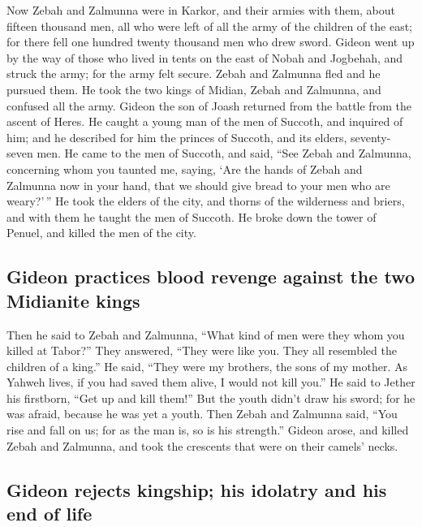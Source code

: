  Now Zebah and Zalmunna were in Karkor, and their armies
with them, about fifteen thousand men, all who were left of all the army
of the children of the east; for there fell one hundred twenty thousand
men who drew sword.  Gideon went up by the way of those
who lived in tents on the east of Nobah and Jogbehah, and struck the
army; for the army felt secure.  Zebah and Zalmunna fled
and he pursued them. He took the two kings of Midian, Zebah and
Zalmunna, and confused all the army.  Gideon the son of
Joash returned from the battle from the ascent of Heres. 
He caught a young man of the men of Succoth, and inquired of him; and he
described for him the princes of Succoth, and its elders, seventy-seven
men.  He came to the men of Succoth, and said, ``See
Zebah and Zalmunna, concerning whom you taunted me, saying, `Are the
hands of Zebah and Zalmunna now in your hand, that we should give bread
to your men who are weary?'\,''  He took the elders of
the city, and thorns of the wilderness and briers, and with them he
taught the men of Succoth.  He broke down the tower of
Penuel, and killed the men of the city.

\hypertarget{gideon-practices-blood-revenge-against-the-two-midianite-kings}{%
\subsection{Gideon practices blood revenge against the two Midianite
kings}\label{gideon-practices-blood-revenge-against-the-two-midianite-kings}}

 Then he said to Zebah and Zalmunna, ``What kind of men
were they whom you killed at Tabor?'' They answered, ``They were like
you. They all resembled the children of a king.''  He
said, ``They were my brothers, the sons of my mother. As Yahweh lives,
if you had saved them alive, I would not kill you.''  He
said to Jether his firstborn, ``Get up and kill them!'' But the youth
didn't draw his sword; for he was afraid, because he was yet a youth.
 Then Zebah and Zalmunna said, ``You rise and fall on us;
for as the man is, so is his strength.'' Gideon arose, and killed Zebah
and Zalmunna, and took the crescents that were on their camels' necks.

\hypertarget{gideon-rejects-kingship-his-idolatry-and-his-end-of-life}{%
\subsection{Gideon rejects kingship; his idolatry and his end of
life}\label{gideon-rejects-kingship-his-idolatry-and-his-end-of-life}}

